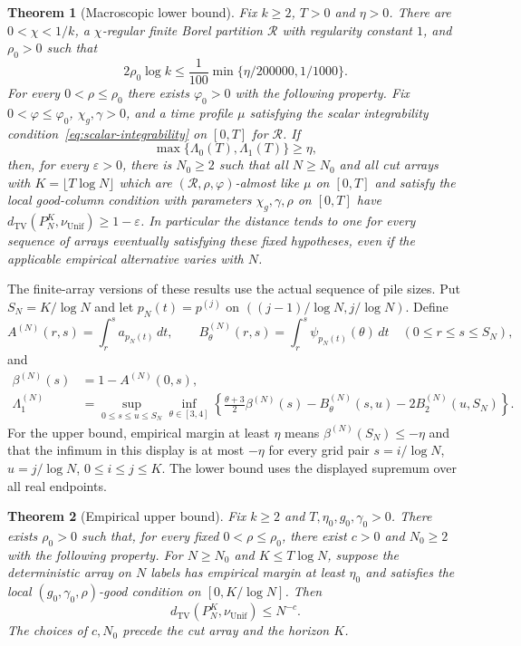 \documentclass[11pt]{article}
\numberwithin{equation}{section}
\newtheorem{theorem}{Theorem}[section]
\theoremstyle{definition}
\theoremstyle{remark}
\newcommand{\TV}{\mathrm{TV}}
\newcommand{\Unif}{\mathrm{Unif}}
\newcommand{\dTV}{d_{\TV}}
\newcommand{\nuUnif}{\nu_{\Unif}}
\newcommand{\1}{\mathbf 1}
\begin{document}
\begin{theorem}[Macroscopic lower bound]\label{thm:macroscopic-lower}
Fix $k\ge2$, $T>0$ and $\eta>0$. There are $0<\chi<1/k$, a $\chi$-regular finite Borel
partition $\mathcal R$ with regularity constant $1$, and $\rho_0>0$ such that
\[
 2\rho_0\log k\le\frac1{100}\min\{\eta/200000,1/1000\}.
\]
For every $0<\rho\le\rho_0$ there exists $\varphi_0>0$ with the following
property. Fix $0<\varphi\le\varphi_0$, $\chi_g,\gamma>0$, and a time
profile $\mu$ satisfying the scalar integrability condition~\eqref{eq:scalar-integrability} on $[0,T]$ for $\mathcal R$. If
\[
 \max\{\Lambda_0(T),\Lambda_1(T)\}\ge\eta,
\]
then, for every $\varepsilon>0$, there is $N_0\ge2$ such that all
$N\ge N_0$ and all cut arrays with $K=\lfloor T\log N\rfloor$ which are
$(\mathcal R,\rho,\varphi)$-almost like $\mu$ on $[0,T]$ and satisfy the local
good-column condition with parameters $\chi_g,\gamma,\rho$ on $[0,T]$
have $\dTV(P_N^K,\nuUnif)\ge1-\varepsilon$. In particular the distance
tends to one for every sequence of arrays eventually satisfying these
fixed hypotheses, even if the applicable empirical alternative varies
with $N$.
\end{theorem}

The finite-array versions of these results use the actual sequence of
pile sizes. Put $S_N=K/\log N$ and let $p_N(t)=p^{(j)}$ on
$((j-1)/\log N,j/\log N)$. Define
\[
 A^{(N)}(r,s)=\int_r^s a_{p_N(t)}\,dt,\qquad
 B^{(N)}_\theta(r,s)=\int_r^s\psi_{p_N(t)}(\theta)\,dt
 \quad(0\le r\le s\le S_N),
\]
and
\begin{align*}
 \beta^{(N)}(s)&=1-A^{(N)}(0,s),\\
 \Lambda_1^{(N)}&=\sup_{0\le s\le u\le S_N}\inf_{\theta\in[3,4]}
 \left\{\frac{\theta+3}{2}\beta^{(N)}(s)
       -B^{(N)}_\theta(s,u)-2B^{(N)}_2(u,S_N)\right\}.
\end{align*}
For the upper bound, empirical margin at least $\eta$ means
$\beta^{(N)}(S_N)\le-\eta$ and that the infimum in this display
is at most $-\eta$ for every grid pair
$s=i/\log N$, $u=j/\log N$, $0\le i\le j\le K$.
The lower bound uses the displayed supremum over all real endpoints.

\begin{theorem}[Empirical upper bound]\label{thm:upper-empirical}
Fix $k\ge2$ and $T,\eta_0,g_0,\gamma_0>0$. There exists $\rho_0>0$
such that, for every fixed $0<\rho\le\rho_0$, there exist $c>0$ and
$N_0\ge2$ with the following property. For $N\ge N_0$ and
$K\le T\log N$, suppose the deterministic array on $N$ labels has
empirical margin at least $\eta_0$ and satisfies the local
$(g_0,\gamma_0,\rho)$-good condition on $[0,K/\log N]$. Then
\begin{equation}\label{eq:upper-empirical-tv}
 \dTV(P_N^K,\nuUnif)\le N^{-c}.
\end{equation}
The choices of $c,N_0$ precede the cut array and the horizon $K$.
\end{theorem}
\end{document}
